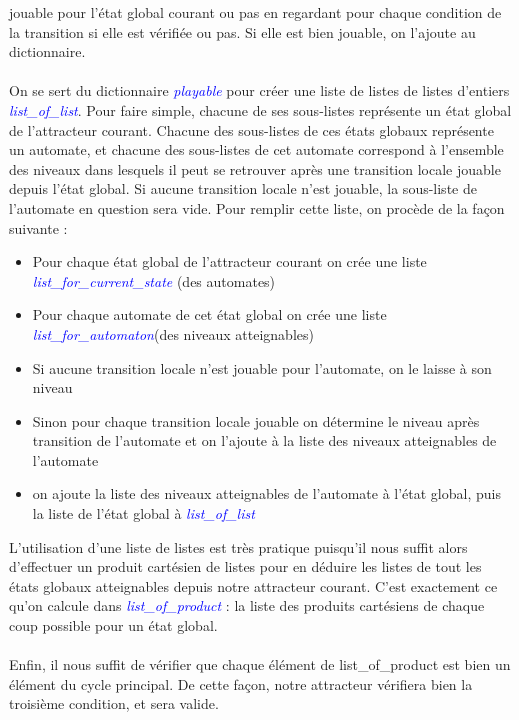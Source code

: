 \documentclass[10pt,a4paper]{article}
\begin{document}
jouable pour l'état global courant ou pas en regardant pour chaque condition de la transition si elle est vérifiée ou pas. Si elle est bien jouable, on l'ajoute au dictionnaire.\\ \\
On se sert du dictionnaire \emph{\textcolor{blue}{playable}} pour créer une liste de listes de listes d'entiers \emph{\textcolor{blue}{list\_of\_list}}. Pour faire simple, chacune de ses sous-listes représente un état global de 
l'attracteur courant. Chacune des sous-listes de ces états globaux représente un automate, et chacune des sous-listes de cet automate correspond à l'ensemble des niveaux dans lesquels il peut se retrouver après une transition locale 
jouable depuis l'état global. Si aucune transition locale n'est jouable, la sous-liste de l'automate en question sera vide. Pour remplir cette liste, on procède de la façon suivante :\\
\begin{itemize}
	\item Pour chaque état global de l'attracteur courant on crée une liste \emph{\textcolor{blue}{list\_for\_current\_state}} (des automates)
	\item Pour chaque automate de cet état global on crée une liste \emph{\textcolor{blue}{list\_for\_automaton}}(des niveaux atteignables)
	\item Si aucune transition locale n'est jouable pour l'automate, on le laisse à son niveau
	\item Sinon pour chaque transition locale jouable on détermine le niveau après transition de l'automate et on l'ajoute à la liste des niveaux atteignables de l'automate
	\item on ajoute la liste des niveaux atteignables de l'automate à l'état global, puis la liste de l'état global à \emph{\textcolor{blue}{list\_of\_list}}\\
\end{itemize}
L'utilisation d'une liste de listes est très pratique puisqu'il nous suffit alors d'effectuer un produit cartésien de listes pour en déduire les listes de tout les états globaux atteignables depuis notre attracteur courant. C'est 
exactement ce qu'on calcule dans \emph{\textcolor{blue}{list\_of\_product}} : la liste des produits cartésiens de chaque coup possible pour un état global.\\ \\
Enfin, il nous suffit de vérifier que chaque élément de list\_of\_product est bien un élément du cycle principal. De cette façon, notre attracteur vérifiera bien la troisième condition, et sera valide.
\end{document}
